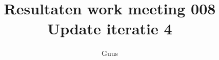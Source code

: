 \documentclass[a4paper,final]{article}
\title{Resultaten work meeting 008 Update iteratie 4 }
\author{Guus}
\begin{document}

\newcommand{\Noc}{\textsc{NoC}\xspace}%
\newcommand{\w}[1]{\textsc{#1}\xspace}%
\newcommand{\qml}{\textsc{Qml}\xspace}%
\newcommand{\qt}{\textsc{Qt}\xspace}%
\newcommand{\qtquick}{\textsc{QtQuick}\xspace}%
\newcommand{\cpp}{\textsc{C++}\xspace}%
\newcommand{\code}[1]{\texttt{#1}\xspace}%
\newcommand{\xmas}{\textsc{xmas}\xspace}%
\newcommand{\xmv}{\textsc{Xmv}\xspace}%
\newcommand{\xmd}{\textsc{Xmd}\xspace}%
\newcommand{\xmvtest}{\textsc{XmvTest}\xspace}%
\newcommand{\xmdtest}{\textsc{XmdTest}\xspace}%
\newcommand{\bitpowder}{\textsc{Bitpowder}\xspace}%
\newcommand{\datamodel}{\textsc{datamodel}\xspace}%
\newcommand{\vt}{\textsc{Vt}\xspace}%
\newcommand{\src}{\textsc{src}\xspace}%
\newcommand{\agilefant}{\textsc{AgileFant}\xspace}%
\newcommand{\een}{\'{e}\'{e}n\xspace}%
\newcommand{\svn}{\textsc{svn}\xspace}%
\newcommand{\git}{\textsc{git}\xspace}%
\newcommand{\github}{\textsc{Github}\xspace}%
\newcommand{\subversion}{\textsc{subversion}\xspace}%
\newcommand{\radboud}{\textsc{Radboud}\xspace}%
\end{document}
